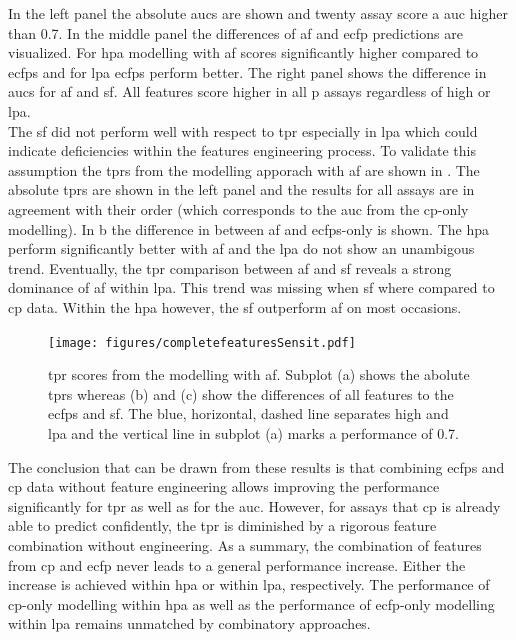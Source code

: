 In the left panel the absolute \ac{auc}s are shown and twenty assay score a \ac{auc} higher than \num{0.7}. In the middle panel the differences of \acl{af} and \ac{ecfp} predictions are visualized. For \acl{hpa} modelling with \acl{af} scores significantly higher compared to \ac{ecfp}s and for \acl{lpa} \ac{ecfp}s perform better. The right panel shows the difference in \ac{auc}s for \acl{af} and \acl{sf}. All features score higher in all \ac{p} assays regardless of high or \acl{lpa}.\\
The \acl{sf} did not perform well with respect to \ac{tpr} especially in \acl{lpa} which could indicate deficiencies within the features engineering process. To validate this assumption the \ac{tpr}s from the modelling apporach with \acl{af} are shown in . The absolute \ac{tpr}s are shown in the left panel and the results for all assays are in agreement with their order (which corresponds to the \ac{auc} from the \ac{cp}-only modelling). In b the difference in between \acl{af} and \ac{ecfp}s-only is shown. The \acl{hpa} perform significantly better with \acl{af} and the \acl{lpa} do not show an unambigous trend. Eventually, the \ac{tpr} comparison between \acl{af} and \acl{sf} reveals a  strong dominance of \acl{af} within \acl{lpa}. This trend was missing when \acl{sf} where compared to \ac{cp} data. Within the \acl{hpa} however, the \acl{sf} outperform \acl{af} on most occasions.
\begin{figure}[H]
	\centering
	\texttt{[image: figures/completefeaturesSensit.pdf]}
	\caption[\ac{tpr} Scores from Modelling with All Features]{\ac{tpr} scores from the modelling with \acf{af}. Subplot (a) shows the abolute \acp{tpr} whereas (b) and (c) show the differences of all features to the \ac{ecfp}s and \acl{sf}. The blue, horizontal, dashed line separates high and \acl{lpa} and the vertical line in subplot (a) marks a performance of \num{0.7}.}
	\label{fig:allfeatsensit}
\end{figure}
The conclusion that can be drawn from these results is that combining \ac{ecfp}s and \ac{cp} data without feature engineering allows improving the performance significantly for \ac{tpr} as well as for the \ac{auc}. However, for assays that \ac{cp} is already able to predict confidently, the \ac{tpr} is diminished by a rigorous feature combination without engineering. As a summary, the combination of features from \ac{cp} and \ac{ecfp} never leads to a general performance increase. Either the increase is achieved within \acl{hpa} or within \acl{lpa}, respectively. The performance of \ac{cp}-only modelling within \acl{hpa} as well as the performance of \ac{ecfp}-only modelling within \acl{lpa} remains unmatched by combinatory approaches.


